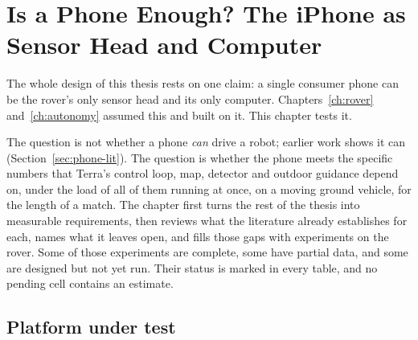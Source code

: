 
\DeclareRobustCommand{\evfull}{\tikz[baseline=-0.6ex]\fill (0,0) circle (0.7ex);}
\DeclareRobustCommand{\evhalf}{\tikz[baseline=-0.6ex]{\draw (0,0) circle (0.7ex); \fill (0,-0.7ex) arc (-90:90:0.7ex) -- cycle;}}
\DeclareRobustCommand{\evnone}{\tikz[baseline=-0.6ex]\draw (0,0) circle (0.7ex);}

\chapter{Is a Phone Enough? The iPhone as Sensor Head and Computer}
\label{ch:phone}

The whole design of this thesis rests on one claim: a single consumer phone can be the rover's only sensor head and its only computer.
Chapters~\ref{ch:rover} and~\ref{ch:autonomy} assumed this and built on it.
This chapter tests it.

The question is not whether a phone \emph{can} drive a robot; earlier work shows it can (Section~\ref{sec:phone-lit}).
The question is whether the phone meets the specific numbers that Terra's control loop, map, detector and outdoor guidance depend on, under the load of all of them running at once, on a moving ground vehicle, for the length of a match.
The chapter first turns the rest of the thesis into measurable requirements, then reviews what the literature already establishes for each, names what it leaves open, and fills those gaps with experiments on the rover.
Some of those experiments are complete, some have partial data, and some are designed but not yet run.
Their status is marked in every table, and no pending cell contains an estimate.

\section{Platform under test}
\label{sec:phone-platform}

